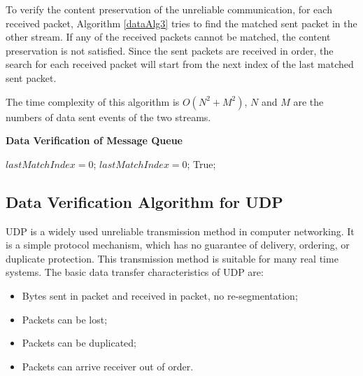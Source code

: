 To verify the content preservation of the unreliable communication, for each received packet, Algorithm \ref{dataAlg3} tries to find the matched sent packet in the other stream. If any of the received packets cannot be matched, the content preservation is not satisfied. Since the sent packets are received in order, the search for each received packet will start from the next index of the last matched sent packet. 

The time complexity of this algorithm is $O(N^2+M^2)$, $N$ and $M$ are the numbers of data sent events of the two streams.

\begin{algorithm}[H]
\DontPrintSemicolon
\caption{{\bf Data Verification of Message Queue } \label{dataAlg3}}
\;
$lastMatchIndex = 0$;\;
$lastMatchIndex = 0$;\;
 \KwRet True;\;
\end{algorithm} 

\subsection{Data Verification Algorithm for UDP}
UDP is a widely used unreliable transmission method in computer networking. It is a simple protocol mechanism, which has no guarantee of delivery, ordering, or duplicate protection. This transmission method is suitable for many real time systems. The basic data transfer characteristics of UDP are:
\begin{itemize}
  \item Bytes sent in packet and received in packet, no re-segmentation;
  \item Packets can be lost;
  \item Packets can be duplicated;
  \item Packets can arrive receiver out of order.
\end{itemize}

